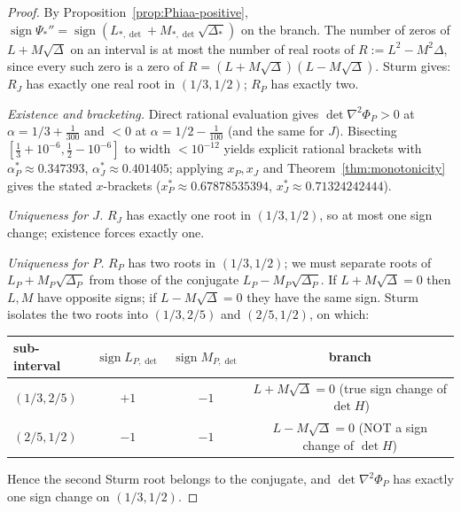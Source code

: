 \documentclass[11pt]{amsart}
\theoremstyle{definition}
\newcommand{\1}{\mathbf 1}
\begin{document}
\begin{proof}
By Proposition~\ref{prop:Phiaa-positive},
$\operatorname{sign}\Psi_*''=\operatorname{sign}(L_{*,\det}+M_{*,\det}\sqrt{\Delta_*})$
on the branch.  The number of zeros of $L+M\sqrt\Delta$ on an interval is at most
the number of real roots of $R:=L^2-M^2\Delta$, since every such zero is a zero
of $R=(L+M\sqrt\Delta)(L-M\sqrt\Delta)$.  Sturm gives: $R_J$ has exactly one real
root in $(1/3,1/2)$; $R_P$ has exactly two.

\emph{Existence and bracketing.}  Direct rational evaluation gives
$\det\nabla^2\Phi_P>0$ at $\alpha=1/3+\tfrac1{300}$ and $<0$ at
$\alpha=1/2-\tfrac1{100}$ (and the same for $J$).  Bisecting
$[\tfrac13+10^{-6},\tfrac12-10^{-6}]$ to width $<10^{-12}$ yields explicit
rational brackets with $\alpha^*_P\approx0.347393$, $\alpha^*_J\approx0.401405$;
applying $x_P,x_J$ and Theorem~\ref{thm:monotonicity} gives the stated $x$-brackets
($x^*_P\approx0.67878535394$, $x^*_J\approx0.71324242444$).

\emph{Uniqueness for $J$.}  $R_J$ has exactly one root in $(1/3,1/2)$, so at most
one sign change; existence forces exactly one.

\emph{Uniqueness for $P$.}  $R_P$ has two roots in $(1/3,1/2)$; we must separate
roots of $L_P+M_P\sqrt{\Delta_P}$ from those of the conjugate
$L_P-M_P\sqrt{\Delta_P}$.  If $L+M\sqrt\Delta=0$ then $L,M$ have opposite signs;
if $L-M\sqrt\Delta=0$ they have the same sign.  Sturm isolates the two roots into
$(1/3,2/5)$ and $(2/5,1/2)$, on which:
\begin{center}
\begin{tabular}{l|cc|c}
sub-interval & $\operatorname{sign} L_{P,\det}$ & $\operatorname{sign} M_{P,\det}$ & branch \\ \hline
$(1/3,2/5)$ & $+1$ & $-1$ & $L+M\sqrt\Delta=0$ (true sign change of $\det H$) \\
$(2/5,1/2)$ & $-1$ & $-1$ & $L-M\sqrt\Delta=0$ (NOT a sign change of $\det H$) \\
\end{tabular}
\end{center}
Hence the second Sturm root belongs to the conjugate, and $\det\nabla^2\Phi_P$
has exactly one sign change on $(1/3,1/2)$.
\end{proof}
\end{document}
